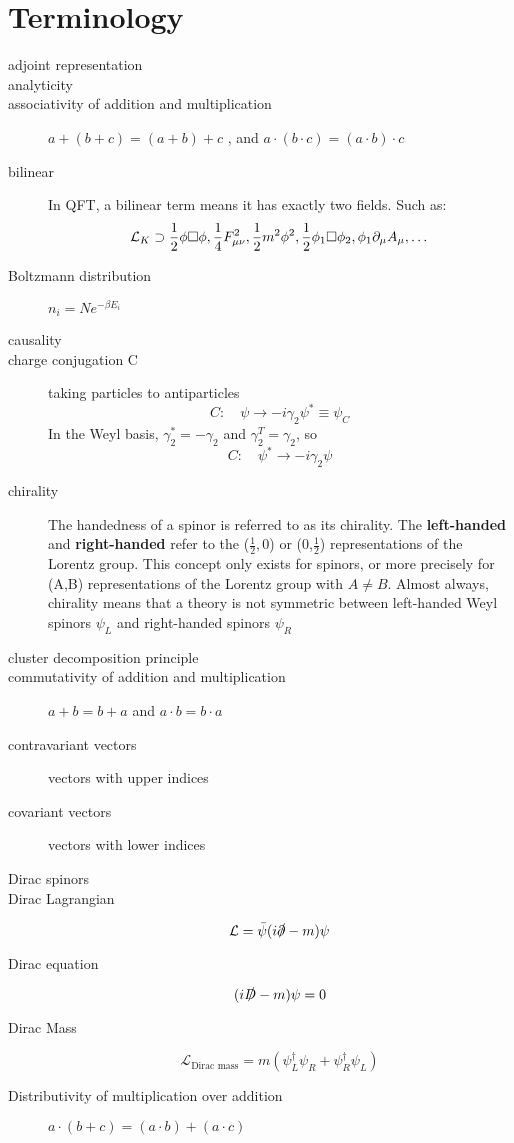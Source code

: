 \chapter{Terminology}
\begin{description}
    \item [adjoint representation]
    \item [analyticity]
    \item [associativity of addition and multiplication]    
	$a+(b+c) = (a+b)+c$   , and $a\cdot(b\cdot c)=(a\cdot b)\cdot c$
    \item [bilinear]	In QFT, a bilinear term means it has exactly two
	fields. Such as:
	\[ \mathcal{L}_K \supset \frac{1}{2}\phi\Box\phi,
	\frac{1}{4}F^2_{\mu\nu}, \frac{1}{2}m^2\phi^2,
	\frac{1}{2}\phi_1\Box\phi_2, \phi_1\partial_\mu A_\mu, \dots \]

    \item [Boltzmann distribution]  $n_{i} = Ne^{-\beta E_{i}}$

    \item [causality]
    \item [charge conjugation C] taking particles to antiparticles
	\[  C:\quad\psi\rightarrow-i\gamma_2\psi^*\equiv\psi_C	\]
	In the Weyl basis, $\gamma_2^*=-\gamma_2$ and $\gamma_2^T=\gamma_2$, so
	\[  C:\quad\psi^*\rightarrow-i\gamma_2\psi  \]
    \item [chirality] The handedness of a spinor is referred to as its
	chirality. The \textbf{left-handed} and \textbf{right-handed} 
	refer to the ($\frac{1}{2},0$) or (0,$\frac{1}{2}$) representations
	of the Lorentz group. This concept only exists for spinors, or more
	precisely for (A,B) representations of the Lorentz group with
	$A\neq B$. Almost always, chirality means that a theory is not
	symmetric between left-handed Weyl spinors $\psi_L$ and right-handed
	spinors $\psi_R$
    \item [cluster decomposition principle]
    \item [commutativity of addition and multiplication] 
	$a+b=b+a$ and $a\cdot b = b\cdot a$
    \item [contravariant vectors]   vectors with upper indices
    \item [covariant vectors]	vectors with lower indices

    \item [Dirac spinors]
    \item [Dirac Lagrangian] 
	\[
	    \mathcal{L}=\bar{\psi}(i\slashed{\partial}-m)\psi
	\]
    \item [Dirac equation]
	\[  
	    (i\slashed{D} -m)\psi =0	
	\]
    \item [Dirac Mass]
	\[  
	    \mathcal{L}_{\text{Dirac mass}} = m(\psi_L^\dag\psi_R + \psi^\dag_R\psi_L) 
	\]
    \item [Distributivity of multiplication over addition]
	$a\cdot(b+c)=(a\cdot b) + (a\cdot c)$


\end{description}
